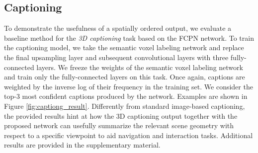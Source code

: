 \documentclass[runningheads]{llncs}
\begin{document}
\begin{table}[h]
\centering
\caption{Results of our FCPN on ShapeNet's part segmentation dataset compared to other state-of-the-art methods. Please note, that we outperform all other methods in 12 out of 16 classes}
\label{table:part_segmentation}
\end{table}


\subsection{Captioning}
\label{section:EvalCaptioniong}

To demonstrate the usefulness of a spatially ordered output, we evaluate a baseline method for the \textit{3D captioning} task based on the FCPN network. 
To train the captioning model, we take the semantic voxel labeling network and replace the final upsampling layer and subsequent convolutional layers with three fully-connected layers. We freeze the weights of the semantic voxel labeling network and train only the fully-connected layers on this task. Once again, captions are weighted by the inverse log of their frequency in the training set. We consider the top-3 most confident captions produced by the network. Examples are shown in Figure \ref{fig:captiong_result}. Differently from standard image-based captioning, the provided results hint at how the 3D captioning output together with the proposed network can usefully summarize the relevant scene geometry with respect to a specific viewpoint to aid navigation and interaction tasks. Additional results are provided in the supplementary material. 
\end{document}
